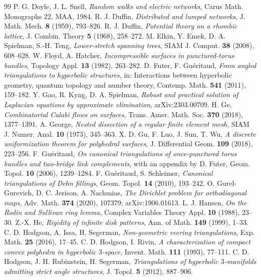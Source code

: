 \documentclass[11pt]{amsart}
\theoremstyle{definition}
\theoremstyle{remark}
\begin{document}
\begin{thebibliography}{99}
 P. G. Doyle, J. L. Snell, \emph{Random walks and electric networks}, Carus Math. Monographs 22, MAA, 1984.
 R. J. Duffin, \emph{Distributed and lumped networks}, J. Math. Mech. \textbf{8} (1959), 793--826.
 R. J. Duffin, \emph{Potential theory on a rhombic lattice}, J. Combin. Theory \textbf{5} (1968), 258--272.
 M. Elkin, Y. Emek, D. A. Spielman, S.-H. Teng, \emph{Lower-stretch spanning trees}, SIAM J. Comput. \textbf{38} (2008), 608--628.
 W. Floyd, A. Hatcher, \emph{Incompressible surfaces in punctured-torus bundles}, Topology Appl. \textbf{13} (1982), 263--282.
 D. Futer, F. Gu\'eritaud, \emph{From angled triangulations to hyperbolic structures}, in: Interactions between hyperbolic geometry, quantum topology and number theory, Contemp. Math. \textbf{541} (2011), 159--182.
 Y. Gao, R. Kyng, D. A. Spielman, \emph{Robust and practical solution of Laplacian equations by approximate elimination}, arXiv:2303.00709.
 H. Ge, \emph{Combinatorial Calabi flows on surfaces}, Trans. Amer. Math. Soc. \textbf{370} (2018), 1377--1391.
 A. George, \emph{Nested dissection of a regular finite element mesh}, SIAM J. Numer. Anal. \textbf{10} (1973), 345--363.
 X. D. Gu, F. Luo, J. Sun, T. Wu, \emph{A discrete uniformization theorem for polyhedral surfaces}, J. Differential Geom. \textbf{109} (2018), 223--256.
 F. Gu\'eritaud, \emph{On canonical triangulations of once-punctured torus bundles and two-bridge link complements}, with an appendix by D. Futer, Geom. Topol. \textbf{10} (2006), 1239--1284.
 F. Gu\'eritaud, S. Schleimer, \emph{Canonical triangulations of Dehn fillings}, Geom. Topol. \textbf{14} (2010), 193--242.
 O. Gurel-Gurevich, D. C. Jerison, A. Nachmias, \emph{The Dirichlet problem for orthodiagonal maps}, Adv. Math. \textbf{374} (2020), 107379; arXiv:1906.01613.
 L. J. Hansen, \emph{On the Rodin and Sullivan ring lemma}, Complex Variables Theory Appl. \textbf{10} (1988), 23--30.
 Z.-X. He, \emph{Rigidity of infinite disk patterns}, Ann. of Math. \textbf{149} (1999), 1--33.
 C. D. Hodgson, A. Issa, H. Segerman, \emph{Non-geometric veering triangulations}, Exp. Math. \textbf{25} (2016), 17--45.
 C. D. Hodgson, I. Rivin, \emph{A characterization of compact convex polyhedra in hyperbolic $3$-space}, Invent. Math. \textbf{111} (1993), 77--111.
 C. D. Hodgson, J. H. Rubinstein, H. Segerman, \emph{Triangulations of hyperbolic $3$-manifolds admitting strict angle structures}, J. Topol. \textbf{5} (2012), 887--906.

\end{thebibliography}
\end{document}
